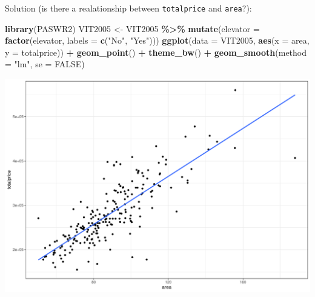 \documentclass[
  ignorenonframetext,
]{beamer}
\newenvironment{Shaded}{\begin{snugshade}}{\end{snugshade}}
\newcommand{\AttributeTok}[1]{\textcolor[rgb]{0.13,0.29,0.53}{#1}}
\newcommand{\ConstantTok}[1]{\textcolor[rgb]{0.56,0.35,0.01}{#1}}
\newcommand{\FunctionTok}[1]{\textcolor[rgb]{0.13,0.29,0.53}{\textbf{#1}}}
\newcommand{\NormalTok}[1]{#1}
\newcommand{\OtherTok}[1]{\textcolor[rgb]{0.56,0.35,0.01}{#1}}
\newcommand{\SpecialCharTok}[1]{\textcolor[rgb]{0.81,0.36,0.00}{\textbf{#1}}}
\newcommand{\StringTok}[1]{\textcolor[rgb]{0.31,0.60,0.02}{#1}}
\begin{document}
\begin{frame}[fragile]{Solution (is there a realationship between
\texttt{totalprice} and \texttt{area}?):}
\protect\hypertarget{solution-is-there-a-realationship-between-totalprice-and-area}{}
\normalsize

\begin{Shaded}
\begin{Highlighting}[]
\FunctionTok{library}\NormalTok{(PASWR2)}
\NormalTok{VIT2005 }\OtherTok{\textless{}{-}}\NormalTok{ VIT2005 }\SpecialCharTok{\%\textgreater{}\%} 
  \FunctionTok{mutate}\NormalTok{(}\AttributeTok{elevator =} \FunctionTok{factor}\NormalTok{(elevator, }\AttributeTok{labels =} \FunctionTok{c}\NormalTok{(}\StringTok{"No"}\NormalTok{, }\StringTok{"Yes"}\NormalTok{)))}
\FunctionTok{ggplot}\NormalTok{(}\AttributeTok{data =}\NormalTok{ VIT2005, }\FunctionTok{aes}\NormalTok{(}\AttributeTok{x =}\NormalTok{ area, }\AttributeTok{y =}\NormalTok{ totalprice)) }\SpecialCharTok{+} 
  \FunctionTok{geom\_point}\NormalTok{() }\SpecialCharTok{+} 
  \FunctionTok{theme\_bw}\NormalTok{() }\SpecialCharTok{+}
  \FunctionTok{geom\_smooth}\NormalTok{(}\AttributeTok{method =} \StringTok{"lm"}\NormalTok{, }\AttributeTok{se =} \ConstantTok{FALSE}\NormalTok{)}
\end{Highlighting}
\end{Shaded}

\begin{center}\includegraphics[width=0.7\linewidth,height=0.4\textheight]{Week5_Lect_files/figure-beamer/unnamed-chunk-29-1} \end{center}
\normalsize
\end{frame}
\end{document}
